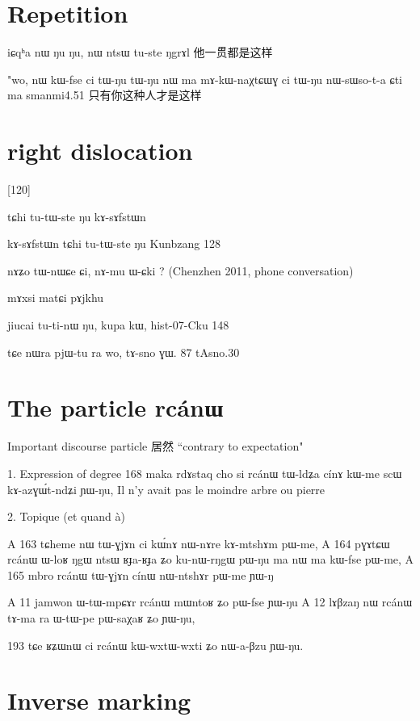 \documentclass[oldfontcommands,oneside,a4paper,11pt]{memoir}
\newcommand{\ipa}[1]{{\phon #1}} %
\newcommand{\wav}[1]{}%
\begin{document}
\section{Repetition}

iɕqʰa nɯ ŋu ŋu, nɯ ntsɯ tu-ste ŋgrɤl
他一贯都是这样



"wo, nɯ kɯ-fse ci tɯ-ŋu tɯ-ŋu nɯ ma  mɤ-kɯ-naχtɕɯɣ ci tɯ-ŋu nɯ-sɯso-t-a ɕti ma
smanmi4.51
只有你这种人才是这样


\section{right dislocation}

\citet{creissels06sgit2}[120]

tɕhi	tu-tɯ-ste	ŋu	kɤ-sɤfstɯn


kɤ-sɤfstɯn tɕhi	tu-tɯ-ste	ŋu	
Kunbzang 128

nɤʑo tɯ-nɯɕe ɕi, nɤ-mu ɯ-ɕki ?
(Chenzhen 2011, phone conversation)

mɤxsi matɕi pɤjkhu
\wav{mAxsi}

jiucai tu-ti-nɯ ŋu, kupa kɯ,
hist-07-Cku
148

tɕe nɯra pjɯ-tu ra wo, tɤ-sno ɣɯ.
87 tAsno.30
\section{The particle \ipa{rcánɯ}}
Important discourse particle
居然 ``contrary to expectation"

1. Expression of degree
168	maka	rdɤstaq	cho	si	rcánɯ	tɯ-ldʑa	cínɤ	kɯ-me	scɯ	kɤ-azɣɯ́t-ndʑi	ɲɯ-ŋu,
Il n'y avait pas le moindre arbre ou pierre


2. Topique (et quand à)

A	163	tɕheme	nɯ	tɯ-ɣjɤn	ci	kɯ́nɤ	nɯ-nɤre	kɤ-mtshɤm	pɯ-me,
A	164	pɣɤtɕɯ	rcánɯ	ɯ-loʁ	ŋgɯ	ntsɯ	ʁɟa-ʁɟa	ʑo	ku-nɯ-rŋgɯ	pɯ-ŋu	ma	nɯ	ma	kɯ-fse	pɯ-me,
A	165	mbro	rcánɯ	tɯ-ɣjɤn	cínɯ	nɯ-ntshɤr	pɯ-me	ɲɯ-ŋ


A	11	  jamwon ɯ-tɯ-mpɕɤr rcánɯ mɯntoʁ ʑo pɯ-fse ɲɯ-ŋu
A	12	lɤβzaŋ nɯ rcánɯ tɤ-ma ra ɯ-tɯ-pe pɯ-saχaʁ ʑo ɲɯ-ŋu,



193	tɕe	ʁʑɯnɯ	ci	rcánɯ	kɯ-wxtɯ-wxti	ʑo	nɯ-a-βzu	ɲɯ-ŋu.

 \section{Inverse marking} \label{sec:inverse.discourse}
\end{document}
